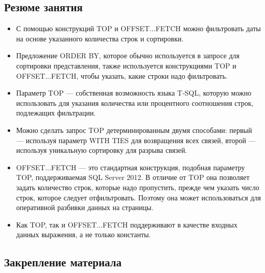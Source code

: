 \subsection*{Резюме занятия}
\begin{itemize}
	\item С помощью конструкций TOP и OFFSET...FETCH можно фильтровать даты на основе указанного количества строк и сортировки.
	\item Предложение ORDER BY, которое обычно используется в запросе для сортировки
	представления, также используется конструкциями TOP и OFFSET...FETCH, чтобы
	указать, какие строки надо фильтровать. 
	\item Параметр TOP — собственная возможность языка T-SQL, которую можно использовать для указания количества или процентного соотношения строк, подлежащих фильтрации. 
	\item Можно сделать запрос TOP детерминированным двумя способами: первый —
	используя параметр WITH TIES для возвращения всех связей, второй — используя
	уникальную сортировку для разрыва связей. 
	\item OFFSET...FETCH — это стандартная конструкция, подобная параметру TOP, поддерживаемая SQL Server 2012. В отличие от TOP она позволяет задать количество
	строк, которые надо пропустить, прежде чем указать число строк, которое следует отфильтровать. Поэтому она может использоваться для оперативной разбивки данных на страницы. 
	\item Как TOP, так и OFFSET...FETCH поддерживают в качестве входных данных выражения, а не только константы. 
\end{itemize}


\subsection*{Закрепление материала}

